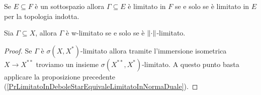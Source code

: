 \begin{remark}
Se $E\subseteq F$ \`e un sottospazio allora $\Gamma\subseteq E$ \`e limitato in $F$ se e solo se \`e limitato in $E$ per la topologia indotta.
\end{remark}

\begin{proposition}\label{PrLimitatoDeboleUgualeLimitatoForte}
Sia $\Gamma\subseteq X$, allora $\Gamma$ \`e w-limitato se e solo se \`e ${\left\Vert{\cdot}\right\Vert}$-limitato.
\end{proposition}
\begin{proof}
Se $\Gamma$ \`e $\sigma(X,X^\ast)$-limitato allora tramite l'immersione isometrica $X\to X^{\ast\ast}$ troviamo un insieme $\sigma(X^{\ast\ast},X^\ast)$-limitato. A questo punto basta applicare la proposizione precedente (\ref{PrLimitatoInDeboleStarEquivaleLimitatoInNormaDuale}).
\end{proof}
